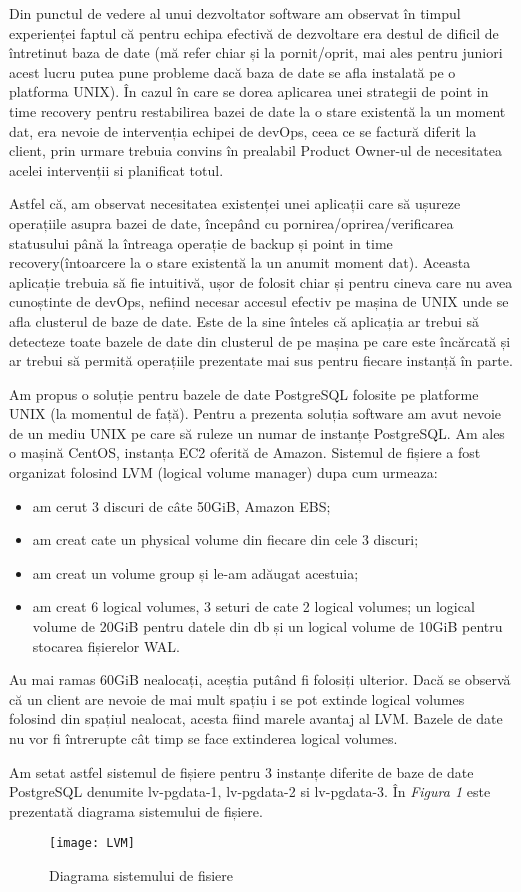 Din punctul de vedere al unui dezvoltator software am observat în timpul experienței faptul că pentru echipa efectivă de dezvoltare era destul de dificil de întretinut baza de date (mă refer chiar și la pornit/oprit, mai ales pentru juniori acest lucru putea pune probleme dacă baza de date se afla instalată pe o platforma UNIX). În cazul în care se dorea aplicarea unei strategii de point in time recovery pentru restabilirea bazei de date la o stare existentă la un moment dat, era nevoie de intervenția echipei de devOps, ceea ce se factură diferit la client, prin urmare trebuia convins în prealabil Product Owner-ul de necesitatea acelei intervenții si planificat totul.
\par
Astfel că, am observat necesitatea existenței unei aplicații care să ușureze operațiile asupra bazei de date, începând cu pornirea/oprirea/verificarea statusului până la întreaga operație de backup și point in time recovery(întoarcere la o stare existentă la un anumit moment dat). Aceasta aplicație trebuia să fie intuitivă, ușor de folosit chiar și pentru cineva care nu avea cunoștinte de devOps, nefiind necesar accesul efectiv pe mașina de UNIX unde se afla clusterul de baze de date. Este de la sine înteles că aplicația ar trebui să detecteze toate bazele de date din clusterul de pe mașina pe care este încărcată și ar trebui să permită operațiile prezentate mai sus pentru fiecare instanță în parte.
\par
Am propus o soluție pentru bazele de date PostgreSQL folosite pe platforme UNIX (la momentul de față). Pentru a prezenta soluția software am avut nevoie de un mediu UNIX pe care să ruleze un numar de instanțe PostgreSQL. Am ales o mașină CentOS, instanța EC2 oferită de Amazon. Sistemul de fișiere a fost organizat folosind LVM (logical volume manager) dupa cum urmeaza:
\begin{itemize}
\item am cerut 3 discuri de câte 50GiB, Amazon EBS;
\item am creat cate un physical volume din fiecare din cele 3 discuri;
\item am creat un volume group și le-am adăugat acestuia;
\item am creat 6 logical volumes, 3 seturi de cate 2 logical volumes; un logical volume de 20GiB pentru datele din db și un logical volume de 10GiB pentru stocarea fișierelor WAL.
\end{itemize}
Au mai ramas 60GiB nealocați, aceștia putând fi folosiți ulterior. Dacă se observă că un client are nevoie de mai mult spațiu i se pot extinde logical volumes folosind din spațiul nealocat, acesta fiind marele avantaj al LVM. Bazele de date nu vor fi întrerupte cât timp se face extinderea logical volumes.
\par
Am setat astfel sistemul de fișiere pentru 3 instanțe diferite de baze de date PostgreSQL denumite lv-pgdata-1, lv-pgdata-2 si lv-pgdata-3. În \textit{Figura 1} este prezentată diagrama sistemului de fișiere.
\begin{figure}[h]
	\centering
	\texttt{[image: LVM]}
    \caption{Diagrama sistemului de fisiere}
    \label{fig:diagSistFiles}
\end{figure}